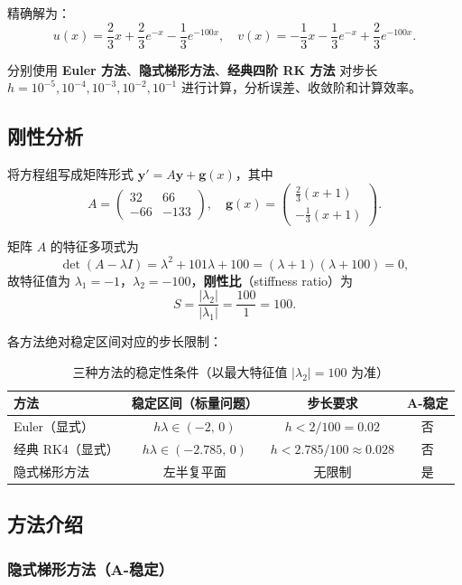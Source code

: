 \documentclass[UTF8,a4paper,11pt]{article}
\begin{document}
精确解为：
\[
  u(x) = \frac{2}{3}x + \frac{2}{3}e^{-x} - \frac{1}{3}e^{-100x},\quad
  v(x) = -\frac{1}{3}x - \frac{1}{3}e^{-x} + \frac{2}{3}e^{-100x}.
\]

分别使用 \textbf{Euler 方法}、\textbf{隐式梯形方法}、\textbf{经典四阶 RK 方法} 对步长 $h = 10^{-5},10^{-4},10^{-3},10^{-2},10^{-1}$ 进行计算，分析误差、收敛阶和计算效率。

\subsection{刚性分析}

将方程组写成矩阵形式 $\bm{y}' = A\bm{y} + \bm{g}(x)$，其中
\[
  A = \begin{pmatrix} 32 & 66 \\ -66 & -133 \end{pmatrix}, \quad
  \bm{g}(x) = \begin{pmatrix} \frac{2}{3}(x+1) \\ -\frac{1}{3}(x+1) \end{pmatrix}.
\]

矩阵 $A$ 的特征多项式为
\[
  \det(A - \lambda I) = \lambda^2 + 101\lambda + 100 = (\lambda+1)(\lambda+100) = 0,
\]
故特征值为 $\lambda_1 = -1$，$\lambda_2 = -100$，\textbf{刚性比}（stiffness ratio）为
\[
  S = \frac{|\lambda_2|}{|\lambda_1|} = \frac{100}{1} = 100.
\]

各方法绝对稳定区间对应的步长限制：

\begin{table}[H]
\centering
\caption{三种方法的稳定性条件（以最大特征值 $|\lambda_2|=100$ 为准）}
\label{tab:stability}
\renewcommand{\arraystretch}{1.3}
\begin{tabular}{lccc}
\toprule
方法 & 稳定区间（标量问题） & 步长要求 & A-稳定 \\
\midrule
Euler（显式）      & $h\lambda \in (-2,\,0)$ & $h < 2/100 = 0.02$ & 否 \\
经典 RK4（显式）   & $h\lambda \in (-2.785,\,0)$ & $h < 2.785/100 \approx 0.028$ & 否 \\
隐式梯形方法        & 左半复平面 & 无限制 & 是 \\
\bottomrule
\end{tabular}
\end{table}

\subsection{方法介绍}

\subsubsection*{隐式梯形方法（A-稳定）}
\end{document}
